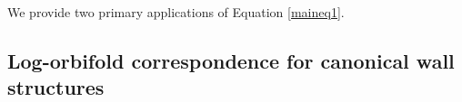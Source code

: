 \documentclass[12pt, oneside]{amsart}   	%
\newcounter{thm}
\newtheorem{corollary}[thm]{Corollary}
\numberwithin{equation}{section}
\numberwithin{thm}{section}
\numberwithin{figure}{section}
\begin{document}


%
%





We provide two primary applications of Equation \ref{maineq1}. 

\subsection{Log-orbifold correspondence for canonical wall structures}
\end{document}
